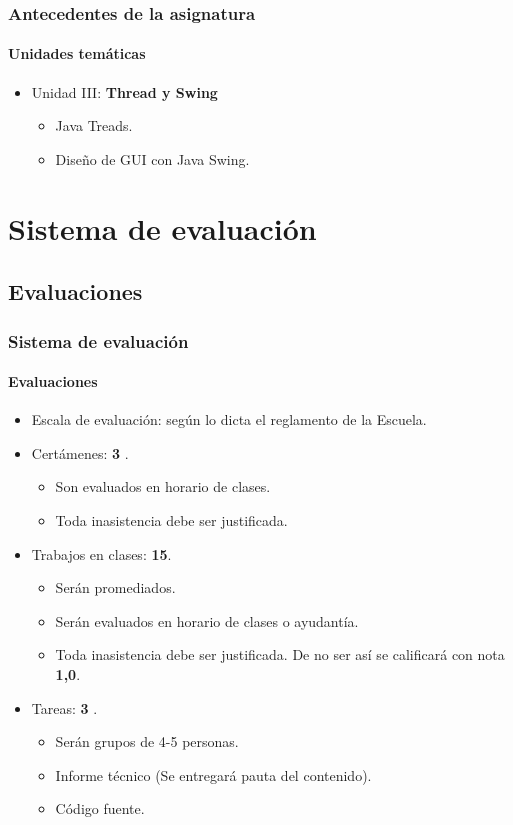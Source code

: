 \documentclass{beamer}
\begin{document}
		\begin{frame}
			\frametitle{Antecedentes de la asignatura}
			\framesubtitle{Unidades tem\'aticas}

			\begin{itemize}
				\item Unidad III: \textbf{Thread y Swing}
				\begin{itemize}
					\item Java Treads.
				  \item Dise\~no de GUI con Java Swing.
				\end{itemize}
			\end{itemize}
		\end{frame}

	\section{Sistema de evaluaci\'on}

		\subsection{Evaluaciones}

		\begin{frame}
			\frametitle{Sistema de evaluaci\'on}
			\framesubtitle{Evaluaciones}

			\begin{itemize}
				\item Escala de evaluaci\'on: seg\'un lo dicta el reglamento de la Escuela.
				\item Cert\'amenes: \textbf{3} .
				\begin{itemize}
					\item Son evaluados en horario de clases.
					\item Toda inasistencia debe ser justificada.
				\end{itemize}
				\item Trabajos en clases: \textbf{15}.
				\begin{itemize}
					\item Ser\'an promediados.
					\item Ser\'an evaluados en horario de clases o ayudant\'ia.
					\item Toda inasistencia debe ser justificada. De no ser as\'i se calificar\'a con nota \textbf{1,0}.
				\end{itemize}
				\item Tareas: \textbf{3} .
				\begin{itemize}
				   \item Ser\'an grupos de 4-5 personas.
					\item Informe t\'ecnico (Se entregar\'a pauta del contenido).
					\item C\'odigo fuente.
				\end{itemize}
			\end{itemize}
		\end{frame}
\end{document}
